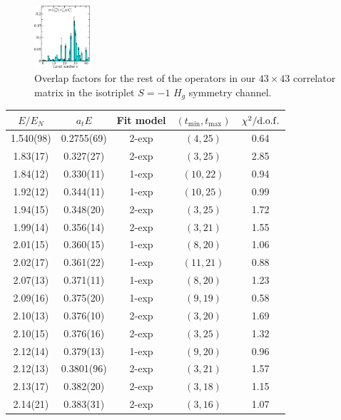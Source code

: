 \begin{figure}[H]
    \includegraphics[width=0.185\textwidth]{figures/sigmas/hg/zfactors/zfactor_isotriplet_pion_sigma-Hg_1-P111-A2m-SS_0-P-1-1-1-G-SS_4.pdf}
    \caption{Overlap factors for the rest of the operators in our $43\times 43$ correlator matrix in the isotriplet $S=-1$ $H_g$ symmetry channel.}\label{fig:hg_zfactors2}
\end{figure}

\newpage
\renewcommand{\arraystretch}{1.2}
\begin{table}[H]
    \centering
    \begin{tabu}{c|c|c|c|c}
        $E / E_N$ & $a_t E$ & Fit model & $(t_{\mathrm{min}}, {t_\mathrm{max}})$ & $\chi^2 / \rm{d.o.f.}$\\
        \hline
        \rowfont{\color{red}}
        1.540(98)&0.2755(69)&2{-}exp&$(4, 25)$&0.64 \\
        1.83(17)&0.327(27)&2{-}exp&$(3, 25)$&2.85 \\
        1.84(12)&0.330(11)&1{-}exp&$(10, 22)$&0.94 \\
        1.92(12)&0.344(11)&1{-}exp&$(10, 25)$&0.99 \\
        1.94(15)&0.348(20)&2{-}exp&$(3, 25)$&1.72 \\
        1.99(14)&0.356(14)&2{-}exp&$(3, 21)$&1.55 \\
        2.01(15)&0.360(15)&1{-}exp&$(8, 20)$&1.06 \\
        2.02(17)&0.361(22)&1{-}exp&$(11, 21)$&0.88 \\
        2.07(13)&0.371(11)&1{-}exp&$(8, 20)$&1.23 \\
        2.09(16)&0.375(20)&1{-}exp&$(9, 19)$&0.58 \\
        2.10(13)&0.376(10)&2{-}exp&$(3, 20)$&1.69 \\
        2.10(15)&0.376(16)&2{-}exp&$(3, 25)$&1.32 \\
        2.12(14)&0.379(13)&1{-}exp&$(9, 20)$&0.96 \\
        \rowfont{\color{red}}
        2.12(13)&0.3801(96)&2{-}exp&$(3, 21)$&1.57 \\
        2.13(17)&0.382(20)&2{-}exp&$(3, 18)$&1.15 \\
        2.14(21)&0.383(31)&2{-}exp&$(3, 16)$&1.07 \\

\end{tabu}
\end{table}
